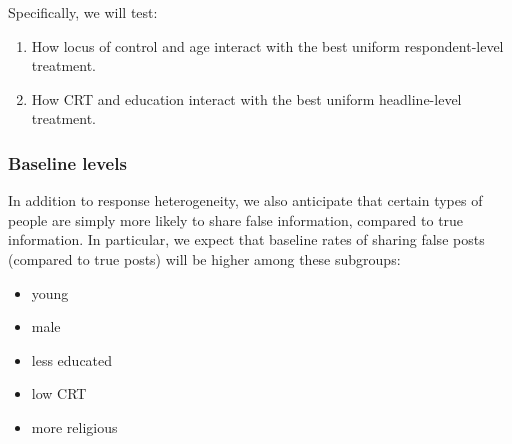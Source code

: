 \documentclass[letterpaper, 12pt, parskip=full,]{scrartcl}
\begin{document}
Specifically, we will test:
\begin{enumerate}
\item How locus of control and age interact with the best uniform respondent-level treatment. 
\item How CRT and education interact with the best uniform headline-level treatment. 
\end{enumerate}


\subsubsection{Baseline levels}\label{baseline_levels}
In addition to response heterogeneity, we also anticipate that certain types of people are simply more likely to share false information, compared to true information. In particular, we expect that baseline rates of sharing false posts (compared to true posts) will be higher among these subgroups:
\begin{itemize}
\item young
\item male
\item less educated
\item low CRT
\item more religious
\end{itemize}

\end{document}
